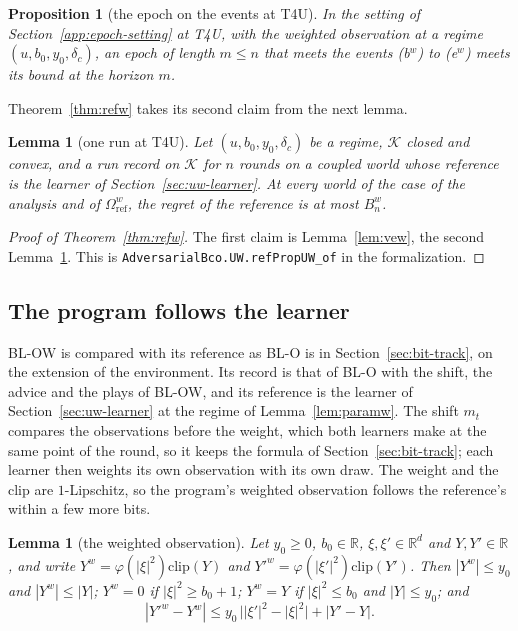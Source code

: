 \documentclass[11pt]{amsart}
\newtheorem{lemma}[theorem]{Lemma}
\newtheorem{proposition}[theorem]{Proposition}
\theoremstyle{definition}
\numberwithin{equation}{section}
\newcommand{\R}{\mathbb{R}}
\newcommand{\cK}{\mathcal{K}}
\begin{document}
\begin{proposition}[the epoch on the events at T4U]\label{prop:epochw}
In the setting of Section~\ref{app:epoch-setting} at T4U, with the weighted observation at a regime $(u,b_0,y_0,\delta_c)$, an epoch of length $m\le n$ that meets the events (b$^w$) to (e$^w$) meets its bound at the horizon $m$.
\end{proposition}
Theorem~\ref{thm:refw} takes its second claim from the next lemma.

\begin{lemma}[one run at T4U]\label{lem:detw}
Let $(u,b_0,y_0,\delta_c)$ be a regime, $\cK$ closed and convex, and a run record on $\cK$ for $n$ rounds on a coupled world whose reference is the learner of Section~\ref{sec:uw-learner}. At every world of the case of the analysis and of $\Omega^w_{\mathrm{ref}}$, the regret of the reference is at most $B^w_n$.
\end{lemma}

\begin{proof}[Proof of Theorem~\ref{thm:refw}]
The first claim is Lemma~\ref{lem:vew}, the second Lemma~\ref{lem:detw}. This is \texttt{AdversarialBco.\allowbreak UW.\allowbreak refPropUW\_of} in the formalization.
\end{proof}

\subsection{The program follows the learner}\label{sec:uw-prog}

BL-OW is compared with its reference as BL-O is in Section~\ref{sec:bit-track}, on the extension of the environment. Its record is that of BL-O with the shift, the advice and the plays of BL-OW, and its reference is the learner of Section~\ref{sec:uw-learner} at the regime of Lemma~\ref{lem:paramw}. The shift $m_t$ compares the observations before the weight, which both learners make at the same point of the round, so it keeps the formula of Section~\ref{sec:bit-track}; each learner then weights its own observation with its own draw. The weight and the clip are $1$-Lipschitz, so the program's weighted observation follows the reference's within a few more bits.

\begin{lemma}[the weighted observation]\label{lem:obsw}
Let $y_0\ge0$, $b_0\in\R$, $\xi,\xi'\in\R^d$ and $Y,Y'\in\R$, and write $Y^w=\varphi(|\xi|^2)\mathrm{clip}(Y)$ and $Y'^w=\varphi(|\xi'|^2)\mathrm{clip}(Y')$. Then $|Y^w|\le y_0$ and $|Y^w|\le|Y|$; $Y^w=0$ if $|\xi|^2\ge b_0+1$; $Y^w=Y$ if $|\xi|^2\le b_0$ and $|Y|\le y_0$; and
\[
|Y'^w-Y^w|\le y_0\,\bigl||\xi'|^2-|\xi|^2\bigr|+|Y'-Y| .
\]
\end{lemma}
\end{document}

